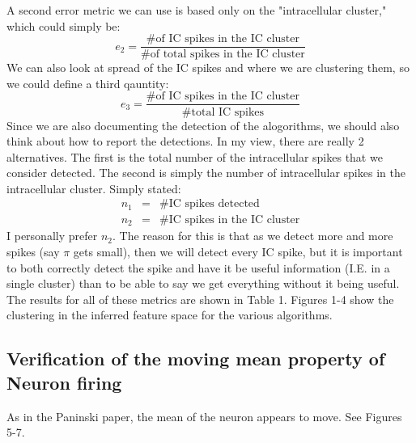 \documentclass{article} %
\newcommand{\beq}{\begin{equation}}
\newcommand{\eeq}{\end{equation}}
\newcommand{\beqs}{\begin{eqnarray}}
\newcommand{\eeqs}{\end{eqnarray}}
\begin{document}
A second error metric we can use is based only on the "intracellular cluster," which could simply be:
\beq
e_2=\frac{\#\text{of IC spikes in the IC cluster}}{\# \text{of total spikes in the IC cluster}}
\eeq
We can also look at spread of the IC spikes and where we are clustering them, so we could define a third qauntity:
\beq
e_3=\frac{\#\text{of IC spikes in the IC cluster}}{\# \text{total IC spikes}}
\eeq
Since we are also documenting the detection of the alogorithms, we should also think about how to report the detections.  In my view, there are really 2 alternatives.  The first is the total number of the intracellular spikes that we consider detected.  The second is simply the number of intracellular spikes in the intracellular cluster.  Simply stated:
\beqs
n_1&=&\#\text{IC spikes detected}\\
n_2&=&\#\text{IC spikes in the IC cluster}
\eeqs
I personally prefer $n_2$.  The reason for this is that as we detect more and more spikes (say $\pi$ gets small), then we will detect every IC spike, but it is important to both correctly detect the spike and have it be useful information (I.E. in a single cluster) than to be able to say we get everything without it being useful.
The results for all of these metrics are shown in Table 1.  Figures 1-4 show the clustering in the inferred feature space for the various algorithms.
\subsection{Verification of the moving mean property of Neuron firing}
As in the Paninski paper, the mean of the neuron appears to move.  See Figures 5-7.
\end{document}
